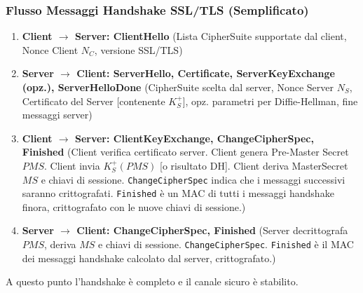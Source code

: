 \subsubsection{Flusso Messaggi Handshake SSL/TLS (Semplificato)}
\label{ssubsec:real_ssl_handshake_flow}
\begin{enumerate}
    \item \textbf{Client $\rightarrow$ Server: ClientHello}
    (Lista CipherSuite supportate dal client, Nonce Client $N_C$, versione SSL/TLS)
    \item \textbf{Server $\rightarrow$ Client: ServerHello, Certificate, ServerKeyExchange (opz.), ServerHelloDone}
    (CipherSuite scelta dal server, Nonce Server $N_S$, Certificato del Server [contenente $K_S^+$], opz. parametri per Diffie-Hellman, fine messaggi server)
    \item \textbf{Client $\rightarrow$ Server: ClientKeyExchange, ChangeCipherSpec, Finished}
    (Client verifica certificato server. Client genera Pre-Master Secret $PMS$. Client invia $K_S^+(PMS)$ [o risultato DH]. Client deriva MasterSecret $MS$ e chiavi di sessione. \texttt{ChangeCipherSpec} indica che i messaggi successivi saranno crittografati. \texttt{Finished} è un MAC di tutti i messaggi handshake finora, crittografato con le nuove chiavi di sessione.)
    \item \textbf{Server $\rightarrow$ Client: ChangeCipherSpec, Finished}
    (Server decrittografa $PMS$, deriva $MS$ e chiavi di sessione. \texttt{ChangeCipherSpec}. \texttt{Finished} è il MAC dei messaggi handshake calcolato dal server, crittografato.)
\end{enumerate}
A questo punto l'handshake è completo e il canale sicuro è stabilito.

